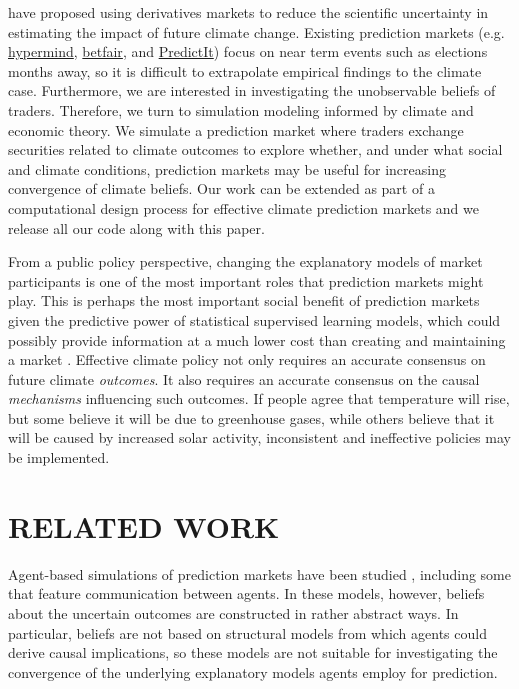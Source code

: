 \documentclass{wscpaperproc}\usepackage[]{graphicx}\usepackage[]{color}
\begin{document}
 have proposed using derivatives markets to reduce the scientific uncertainty in estimating the impact of future climate change. Existing prediction markets (e.g. \href{https://hypermind.com/hypermind/app.html}{hypermind}, \href{https://www.betfair.com/exchange/}{betfair}, and \href{https://www.predictit.org/}{PredictIt}) focus on near term events such as elections months away, so it is difficult to extrapolate empirical findings to the climate case. Furthermore, we are interested in investigating the unobservable beliefs of traders. Therefore, we turn to simulation modeling informed by climate and economic theory. We simulate a prediction market where traders exchange securities related to climate outcomes to explore whether, and under what social and climate conditions, prediction markets may be useful for increasing convergence of climate beliefs. Our work can be extended as part of a computational design process for effective climate prediction markets and we release all our code along with this paper.

From a public policy perspective, changing the explanatory models of market participants is one of the most important roles that prediction markets might play. This is perhaps the most important social benefit of prediction markets given the predictive power of statistical supervised learning models, which could possibly provide information at a much lower cost than creating and maintaining a market . Effective climate policy not only requires an accurate consensus on future climate \emph{outcomes\/}. It also requires an accurate consensus on the causal \emph{mechanisms\/} influencing such outcomes. If people agree that temperature will rise, but some believe it will be due to greenhouse gases, while others believe that it will be caused by increased solar activity, inconsistent and ineffective policies may be implemented.

\section{RELATED WORK}

Agent-based simulations of prediction markets have been studied , including some that feature communication between agents. In these models, however, beliefs about the uncertain outcomes are constructed in rather abstract ways. In particular, beliefs are not based on structural models from which agents could derive causal implications, so these models are not suitable for investigating the convergence of the underlying explanatory models agents employ for prediction.
\end{document}
